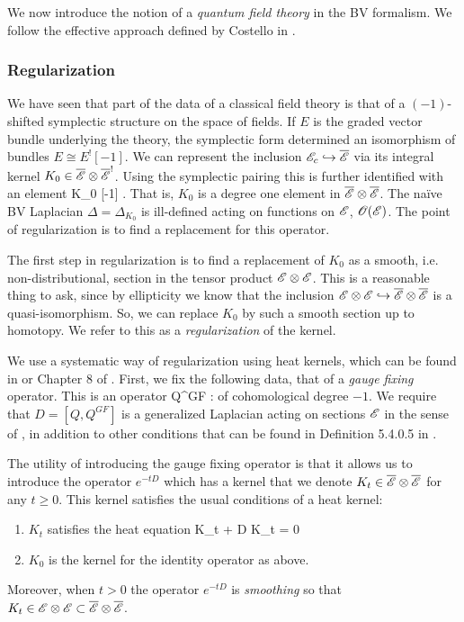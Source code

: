 We now introduce the notion of a {\em quantum field theory} in the BV formalism.
We follow the effective approach defined by Costello in \cite{CostelloRenormalization}.

\subsubsection{Regularization}

We have seen that part of the data of a classical field theory is that of a $(-1)$-shifted symplectic structure on the space of fields. 
If $E$ is the graded vector bundle underlying the theory, the symplectic form determined an isomorphism of bundles $E \cong E^![-1]$. 
We can represent the inclusion $\mathscr E_c \hookrightarrow \overline{\mathscr E}$ via its integral kernel $K_0 \in \overline{\mathscr E} \otimes \overline{\mathscr E}^!$. 
Using the symplectic pairing this is further identified with an element 
\ben
K_0 \in \Bar{\sE} \tensor \Bar{\sE} [-1] .
\een
That is, $K_0$ is a degree one element in $\overline{\mathscr E} \otimes \overline{\mathscr E}$.
The na\"{i}ve BV Laplacian $\Delta = \Delta_{K_0}$ is ill-defined acting on functions on $\mathscr E$, $\mathscr O(\mathscr E)$. 
The point of regularization is to find a replacement for this operator.

The first step in regularization is to find a replacement of $K_0$ as a smooth, i.e. non-distributional, section in the tensor product $\mathscr E \otimes \mathscr E$. 
This is a reasonable thing to ask, since by ellipticity we know that the inclusion $\mathscr E \otimes \mathscr E \hookrightarrow \overline{\mathscr E} \otimes \overline{\mathscr E}$ is a quasi-isomorphism. 
So, we can replace $K_0$ by such a smooth section up to homotopy.
We refer to this as a {\em regularization} of the kernel.

We use a systematic way of regularization using heat kernels, which can be found in \cite{CostelloRenormalization} or Chapter 8 of \cite{CG2}. 
First, we fix the following data, that of a {\em gauge fixing} operator.
This is an operator 
\ben
Q^{GF} : \sE \to \sE[-1]
\een 
of cohomological degree $-1$.
We require that $D = [Q,Q^{GF}]$ is a generalized Laplacian acting on sections $\mathscr E$ in the sense of \cite{GetzlerDirac}, in addition to other conditions that can be found in Definition 5.4.0.5 in \cite{CG2}.

The utility of introducing the gauge fixing operator is that it allows us to introduce the operator $e^{-t D}$ which has a kernel that we denote $K_t \in \overline{\mathscr E} \otimes \overline{\mathscr E}$ for any $t \geq 0$. 
This kernel satisfies the usual conditions of a heat kernel:
\begin{enumerate}
\item $K_t$ satisfies the heat equation
\ben
{} K_t + D K_t = 0
\een
\item $K_0$ is the kernel for the identity operator as above.
\end{enumerate}
Moreover, when $t > 0$ the operator $e^{-t D}$ is {\em smoothing} so that $K_t \in \mathscr E \otimes \mathscr E \subset \overline{\mathscr E} \otimes \overline{\mathscr E}$. 

